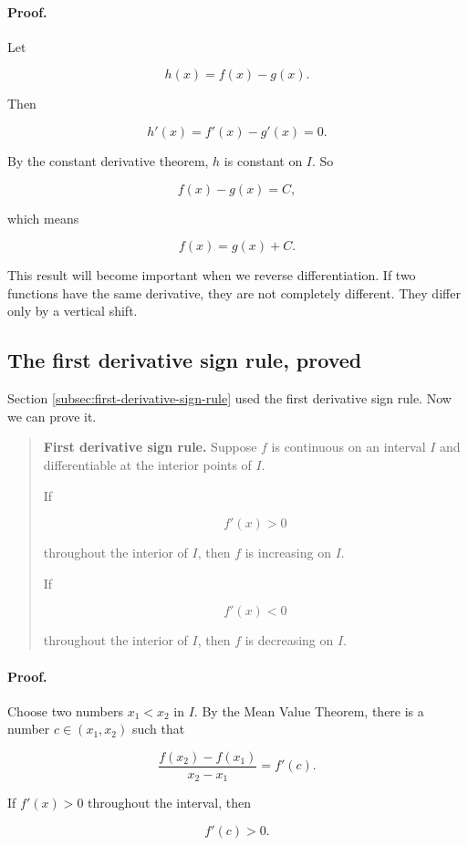 \paragraph{Proof.}
Let

\[
h(x)=f(x)-g(x).
\]

Then

\[
h'(x)=f'(x)-g'(x)=0.
\]

By the constant derivative theorem, \(h\) is constant on \(I\).  So

\[
f(x)-g(x)=C,
\]

which means

\[
f(x)=g(x)+C.
\]

This result will become important when we reverse differentiation.  If two functions
have the same derivative, they are not completely different.  They differ only by a
vertical shift.

\subsection{The first derivative sign rule, proved}
\label{subsec:first-derivative-sign-rule-proof}

Section \ref{subsec:first-derivative-sign-rule} used the first derivative sign rule.
Now we can prove it.

\begin{quote}
\textbf{First derivative sign rule.}
Suppose \(f\) is continuous on an interval \(I\) and differentiable at the interior
points of \(I\).

If

\[
f'(x)>0
\]

throughout the interior of \(I\), then \(f\) is increasing on \(I\).

If

\[
f'(x)<0
\]

throughout the interior of \(I\), then \(f\) is decreasing on \(I\).
\end{quote}

\paragraph{Proof.}
Choose two numbers \(x_1<x_2\) in \(I\).  By the Mean Value Theorem, there is a
number \(c\in(x_1,x_2)\) such that

\[
\frac{f(x_2)-f(x_1)}{x_2-x_1}=f'(c).
\]

If \(f'(x)>0\) throughout the interval, then

\[
f'(c)>0.
\]

